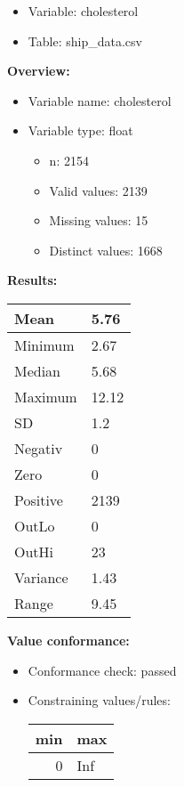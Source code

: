 \documentclass[
]{article}
\providecommand{\tightlist}{%
  \setlength{\itemsep}{0pt}\setlength{\parskip}{0pt}}
\begin{document}
\begin{itemize}
\tightlist
\item
  Variable: cholesterol
\item
  Table: ship\_data.csv
\end{itemize}

\textbf{Overview:}

\begin{itemize}
\tightlist
\item
  Variable name: cholesterol
\item
  Variable type: float

  \begin{itemize}
  \tightlist
  \item
    n: 2154
  \item
    Valid values: 2139
  \item
    Missing values: 15
  \item
    Distinct values: 1668
  \end{itemize}
\end{itemize}

\textbf{Results:}\\

\begin{table}[H]
\centering
\begin{tabular}{l|l}
\hline
Mean & 5.76\\
\hline
Minimum & 2.67\\
\hline
Median & 5.68\\
\hline
Maximum & 12.12\\
\hline
SD & 1.2\\
\hline
Negativ & 0\\
\hline
Zero & 0\\
\hline
Positive & 2139\\
\hline
OutLo & 0\\
\hline
OutHi & 23\\
\hline
Variance & 1.43\\
\hline
Range & 9.45\\
\hline
\end{tabular}
\end{table}

\textbf{Value conformance:}

\begin{itemize}
\tightlist
\item
  Conformance check: passed
\item
  Constraining values/rules:

  \begin{table}[H]
  \centering
  \begin{tabular}{r|l}
  \hline
  \textbf{min} & \textbf{max}\\
  \hline
  0 & Inf\\
  \hline
  \end{tabular}
  \end{table}
\end{itemize}
\end{document}
